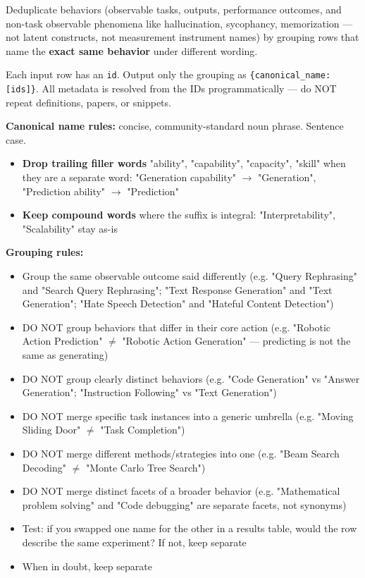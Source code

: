 \begin{tcolorbox}[breakable,enhanced,colback=blue!3,colframe=blue!40!black,title={Prompt},fonttitle=\bfseries,left=8pt,right=8pt,top=6pt,bottom=6pt]

Deduplicate behaviors (observable tasks, outputs, performance outcomes, and non-task observable phenomena like hallucination, sycophancy, memorization --- not latent constructs, not measurement instrument names) by grouping rows that name the \textbf{exact same behavior} under different wording.

Each input row has an \texttt{id}. Output only the grouping as \texttt{\{canonical\_name: [ids]\}}. All metadata is resolved from the IDs programmatically --- do NOT repeat definitions, papers, or snippets.

\textbf{Canonical name rules:} concise, community-standard noun phrase. Sentence case.
\begin{itemize}
\item \textbf{Drop trailing filler words} "ability", "capability", "capacity", "skill" when they are a separate word: "Generation capability" $\rightarrow$ "Generation", "Prediction ability" $\rightarrow$ "Prediction"
\item \textbf{Keep compound words} where the suffix is integral: "Interpretability", "Scalability" stay as-is
\end{itemize}

\textbf{Grouping rules:}
\begin{itemize}
\item Group the same observable outcome said differently (e.g. "Query Rephrasing" and "Search Query Rephrasing"; "Text Response Generation" and "Text Generation"; "Hate Speech Detection" and "Hateful Content Detection")
\item DO NOT group behaviors that differ in their core action (e.g. "Robotic Action Prediction" $\neq$ "Robotic Action Generation" --- predicting is not the same as generating)
\item DO NOT group clearly distinct behaviors (e.g. "Code Generation" vs "Answer Generation"; "Instruction Following" vs "Text Generation")
\item DO NOT merge specific task instances into a generic umbrella (e.g. "Moving Sliding Door" $\neq$ "Task Completion")
\item DO NOT merge different methods/strategies into one (e.g. "Beam Search Decoding" $\neq$ "Monte Carlo Tree Search")
\item DO NOT merge distinct facets of a broader behavior (e.g. "Mathematical problem solving" and "Code debugging" are separate facets, not synonyms)
\item Test: if you swapped one name for the other in a results table, would the row describe the same experiment? If not, keep separate
\item When in doubt, keep separate
\end{itemize}


\end{tcolorbox}
